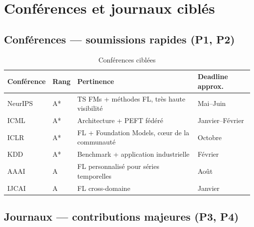 \documentclass[12pt, a4paper]{report}
\begin{document}
\chapter{Conférences et journaux ciblés}

\section{Conférences — soumissions rapides (P1, P2)}

\begin{table}[h!]
\centering
\caption{Conférences ciblées}
\label{tab:conferences}
\renewcommand{\arraystretch}{1.5}
\begin{tabularx}{\textwidth}{llXl}
\toprule
Conférence & Rang & Pertinence & Deadline approx. \\
\midrule
NeurIPS & A* & TS FMs + méthodes FL, très haute visibilité & Mai--Juin \\
ICML & A* & Architecture + PEFT fédéré & Janvier--Février \\
ICLR & A* & FL + Foundation Models, cœur de la communauté & Octobre \\
KDD & A* & Benchmark + application industrielle & Février \\
AAAI & A & FL personnalisé pour séries temporelles & Août \\
IJCAI & A & FL cross-domaine & Janvier \\
\bottomrule
\end{tabularx}
\end{table}

\section{Journaux — contributions majeures (P3, P4)}
\end{document}
